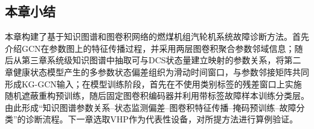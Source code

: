 \subsection{本章小结}

本章构建了基于知识图谱和图卷积网络的燃煤机组汽轮机系统故障诊断方法。首先介绍GCN在参数图上的特征传播过程，并采用两层图卷积聚合参数邻域信息；随后从第三章系统级知识图谱中抽取可与DCS状态量建立映射的参数关系，将第二章健康状态模型产生的多参数状态偏差组织为滑动时间窗口，与参数邻接矩阵共同形成KG-GCN输入；在模型训练阶段，首先在不使用类别标签的残差窗口上实施随机遮蔽重构预训练，随后固定图卷积编码器并利用带标签故障样本训练分类层。由此形成“知识图谱参数关系--状态监测偏差--图卷积特征传播--掩码预训练--故障分类”的诊断流程。下一章选取VHP作为代表性设备，对所提方法进行算例验证。